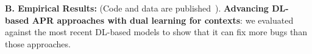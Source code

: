 

{\bf B. Empirical Results:} (Code and data are
published~\cite{CDFix2022}).  {\bf Advancing DL-based APR approaches
  with dual learning for contexts}: we evaluated {\tool} against the
most recent DL-based models to show that it can fix more bugs than
those approaches.







